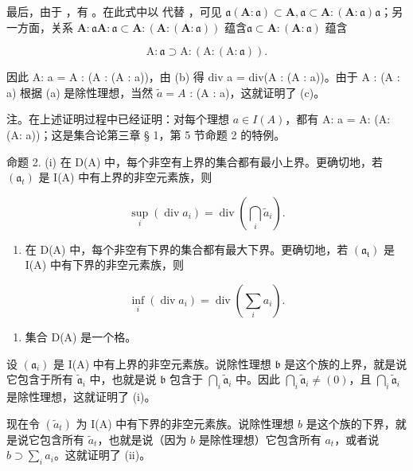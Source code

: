 最后，由于 ，有 。在此式中以  代替 ，可见 \(\mathfrak{a}(\mathbf{A}:\mathfrak{a})\subset \mathbf{A},\mathfrak{a}\subset \mathbf{A}:(\mathbf{A}:\mathfrak{a})\)\(\mathfrak{a}\)；另一方面，关系 \(\mathbf{A}:\mathfrak{a}\)\(\mathbf{A}:\mathfrak{a}\subset \mathbf{A}:(\mathbf{A}:(\mathbf{A}:\mathfrak{a}))\) 蕴含\(\mathfrak{a}\subset \mathbf{A}:(\mathbf{A}:\mathfrak{a})\) 蕴含

\[
\mathrm{A}: \mathfrak {a} \supset \mathrm{A}: (\mathrm{A}: (\mathrm{A}: \mathfrak {a})).
\]

因此 A: a = A : (A : (A : a))，由 (b) 得 div a = div(A : (A : a))。由于 A : (A : a) 根据 (a) 是除性理想，当然 \(\tilde{a} = A\) : (A : a)，这就证明了 (c)。

注。在上述证明过程中已经证明：对每个理想 \(a \in I(A)\)，都有 A: a = A: (A: (A: a))；这是集合论第三章 § 1，第 5 节命题 2 的特例。

命题 2. (i) 在 D(A) 中，每个非空有上界的集合都有最小上界。更确切地，若 \((\mathfrak{a}_t)\) 是 I(A) 中有上界的非空元素族，则

\[
\sup _ {i} (\operatorname{div} a _ {i}) = \operatorname{div} \left(\bigcap_ {i} \tilde {a} _ {i}\right).
\]

\begin{enumerate}
\def\labelenumi{(\roman{enumi})}
\setcounter{enumi}{1}
\tightlist
\item
在 D(A) 中，每个非空有下界的集合都有最大下界。更确切地，若 \((\mathfrak{a}_{\mathfrak{t}})\) 是 I(A) 中有下界的非空元素族，则
\end{enumerate}

\[
\inf _ {i} (\operatorname{div} a _ {i}) = \operatorname{div} \left(\sum_ {i} a _ {i}\right).
\]

\begin{enumerate}
\def\labelenumi{(\roman{enumi})}
\setcounter{enumi}{2}
\tightlist
\item
集合 D(A) 是一个格。
\end{enumerate}

设 \((\mathfrak{a}_i)\) 是 I(A) 中有上界的非空元素族。说除性理想 \(\mathfrak{b}\) 是这个族的上界，就是说它包含于所有 \(\tilde{\mathfrak{a}}_i\) 中，也就是说 \(\mathfrak{b}\) 包含于 \(\bigcap_{i} \tilde{\mathfrak{a}}_i\) 中。因此 \(\bigcap_{i} \tilde{\mathfrak{a}}_i \neq (0)\)，且 \(\bigcap_{i} \tilde{\mathfrak{a}}_i\) 是除性理想，这就证明了 (i)。

现在令 \((\tilde{a}_t)\) 为 I(A) 中有下界的非空元素族。说除性理想 \(b\) 是这个族的下界，就是说它包含所有 \(\tilde{a}_t\)，也就是说（因为 \(b\) 是除性理想）它包含所有 \(a_t\)，或者说 \(b \supset \sum_{i} a_i\)。这就证明了 (ii)。

